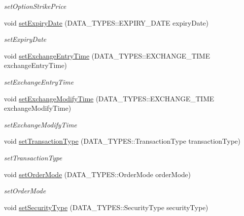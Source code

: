 \begin{DoxyCompactItemize}
\begin{DoxyCompactList}\small\item\em set\-Option\-Strike\-Price \end{DoxyCompactList}\item 
void \hyperlink{class_a_p_i2_1_1_single_order_a5a22afab70ba6be6b58565bf299d1388}{set\-Expiry\-Date} (D\-A\-T\-A\-\_\-\-T\-Y\-P\-E\-S\-::\-E\-X\-P\-I\-R\-Y\-\_\-\-D\-A\-T\-E expiry\-Date)
\begin{DoxyCompactList}\small\item\em set\-Expiry\-Date \end{DoxyCompactList}\item 
void \hyperlink{class_a_p_i2_1_1_single_order_ad4272f16e98d3d7071d2836e52cdbd85}{set\-Exchange\-Entry\-Time} (D\-A\-T\-A\-\_\-\-T\-Y\-P\-E\-S\-::\-E\-X\-C\-H\-A\-N\-G\-E\-\_\-\-T\-I\-M\-E exchange\-Entry\-Time)
\begin{DoxyCompactList}\small\item\em set\-Exchange\-Entry\-Time \end{DoxyCompactList}\item 
void \hyperlink{class_a_p_i2_1_1_single_order_aabb08f44d026b11b8cd281041817c79d}{set\-Exchange\-Modify\-Time} (D\-A\-T\-A\-\_\-\-T\-Y\-P\-E\-S\-::\-E\-X\-C\-H\-A\-N\-G\-E\-\_\-\-T\-I\-M\-E exchange\-Modify\-Time)
\begin{DoxyCompactList}\small\item\em set\-Exchange\-Modify\-Time \end{DoxyCompactList}\item 
void \hyperlink{class_a_p_i2_1_1_single_order_a869aef954f9ae0f0619beb28e312c988}{set\-Transaction\-Type} (D\-A\-T\-A\-\_\-\-T\-Y\-P\-E\-S\-::\-Transaction\-Type transaction\-Type)
\begin{DoxyCompactList}\small\item\em set\-Transaction\-Type \end{DoxyCompactList}\item 
void \hyperlink{class_a_p_i2_1_1_single_order_a952ff552cc23a34d42f81deaa62959c8}{set\-Order\-Mode} (D\-A\-T\-A\-\_\-\-T\-Y\-P\-E\-S\-::\-Order\-Mode order\-Mode)
\begin{DoxyCompactList}\small\item\em set\-Order\-Mode \end{DoxyCompactList}\item 
void \hyperlink{class_a_p_i2_1_1_single_order_a1fe75fe66191bee3df3f69b5d9b3dd75}{set\-Security\-Type} (D\-A\-T\-A\-\_\-\-T\-Y\-P\-E\-S\-::\-Security\-Type security\-Type)

\end{DoxyCompactItemize}
